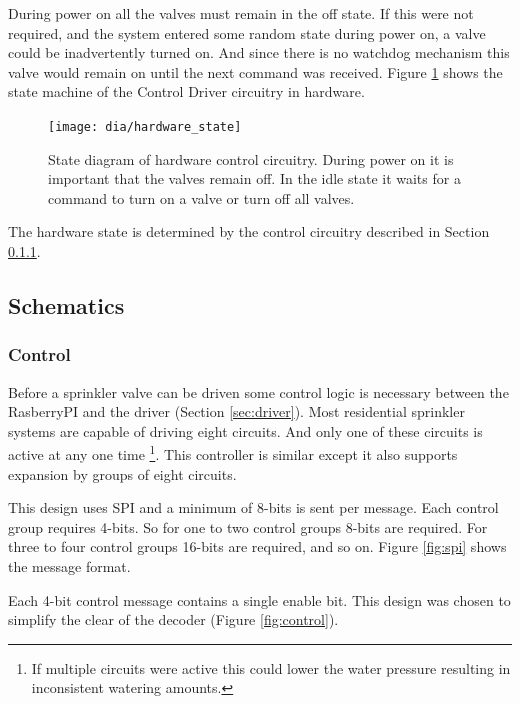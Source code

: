 \documentclass{article}
\begin{document}
During power on all the valves must remain in the off state.
If this were not required, and the system entered some random
state during power on, a valve could be inadvertently turned on.
And since there is no watchdog mechanism this valve would remain
on until the next command was received.
Figure \ref{fig:hwstate} shows the state machine of the
Control Driver circuitry in hardware.

\begin{figure}[h!]
\centering
\texttt{[image: dia/hardware\_state]}
\caption{State diagram of hardware control circuitry.
During power on it is important that the valves remain off.
In the idle state it waits for a command to turn on a valve or
turn off all valves.}\label{fig:hwstate}
\end{figure}

The hardware state is determined by the control circuitry
described in Section \ref{sec:control}.


\clearpage
\FloatBarrier
\subsection{Schematics}

\FloatBarrier
\subsubsection{Control}
\label{sec:control}

Before a sprinkler valve can be driven some control logic is necessary
between the RasberryPI and the driver (Section \ref{sec:driver}).
Most residential sprinkler systems are capable of driving eight circuits.
And only one of these circuits is active at any one time
\footnote{If multiple circuits were active this could lower the
water pressure resulting in inconsistent watering amounts.}.
This controller is similar except it also supports expansion by groups
of eight circuits.

This design uses SPI and a minimum of 8-bits is sent per message.
Each control group requires 4-bits.  So for one to two control groups
8-bits are required.  For three to four control groups 16-bits are required,
and so on.  Figure \ref{fig:spi} shows the message format.

Each 4-bit control message contains a single enable bit.
This design was chosen to simplify the clear of the decoder
(Figure \ref{fig:control}).
\end{document}
